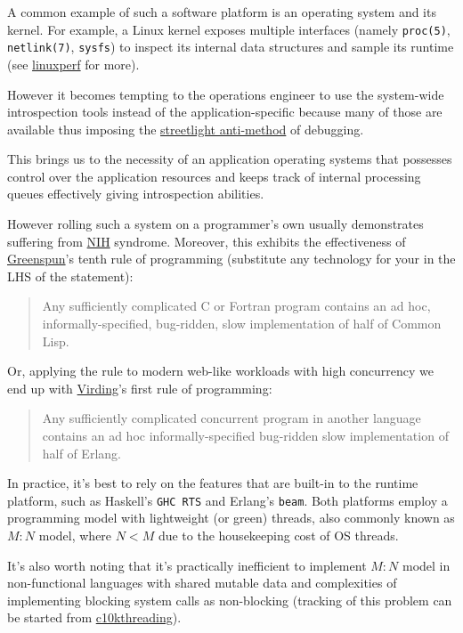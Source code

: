 \documentclass[10pt, a5paper]{article}
\begin{document}
A common example of such a software platform is an operating system and its kernel. For example, a Linux kernel exposes multiple interfaces (namely {\tt proc(5)}, {\tt netlink(7)}, {\tt sysfs}) to inspect its internal data structures and sample its runtime (see \href{http://joyent.com/blog/linux-performance-analysis-and-tools-brendan-gregg-s-talk-at-scale-11x}{linuxperf} for more).

However it becomes tempting to the operations engineer to use the system-wide introspection tools instead of the application-specific because many of those are available thus imposing the \href{http://queue.acm.org/detail.cfm?id=2413037}{streetlight anti-method} of debugging.

This brings us to the necessity of an application operating systems that possesses control over the application resources and keeps track of internal processing queues effectively giving introspection abilities.

However rolling such a system on a programmer's own usually demonstrates suffering from \href{http://en.wikipedia.org/wiki/Not_invented_here}{NIH} syndrome. Moreover, this exhibits the effectiveness of \href{http://en.wikipedia.org/wiki/Greenspun's_tenth_rule}{Greenspun}'s tenth rule of programming (substitute any technology for your in the LHS of the statement):

\begin{quote}%
Any sufficiently complicated C or Fortran program contains an ad hoc, informally-specified, bug-ridden, slow implementation of half of Common Lisp.
\end{quote}
Or, applying the rule to modern web-like workloads with high concurrency we end up with \href{http://rvirding.blogspot.com/2008/01/virdings-first-rule-of-programming.html}{Virding}'{}s first rule of programming:

\begin{quote}%
Any sufficiently complicated concurrent program in another language contains an ad hoc informally-specified bug-ridden slow implementation of half of Erlang.

\end{quote}
In practice, it's best to rely on the features that are built-in to the runtime platform, such as Haskell's {\tt GHC RTS} and Erlang's {\tt beam}. Both platforms employ a programming model with lightweight (or green) threads, also commonly known as $ M:N $ model, where $ N < M $ due to the housekeeping cost of OS threads.

It's also worth noting that it's practically inefficient to implement $ M:N $ model in non-functional languages with shared mutable data and complexities of implementing blocking system calls as non-blocking (tracking of this problem can be started from \href{http://www.kegel.com/c10k.html#1:1}{c10kthreading}).
\end{document}

